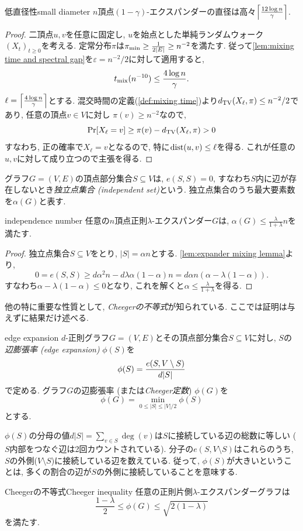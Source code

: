 \begin{proposition}{低直径性}{small diameter}
    $n$頂点$(1-\gamma)$-エクスパンダーの直径は高々$\ceil*{\frac{12\log n}{\gamma}}$.
\end{proposition}
\begin{proof}
    二頂点$u,v$を任意に固定し,
    $u$を始点とした単純ランダムウォーク$(X_t)_{t\ge 0}$を考える.
    定常分布$\pi$は$\pimin \ge \frac{1}{2|E|} \ge n^{-2}$を満たす.
    従って\cref{lem:mixing time and spectral gap}を$\varepsilon=n^{-2}/2$に対して適用すると,
    \[
        \tmix(n^{-10}) \le \frac{4\log n}{\gamma}.
    \]
    $\ell=\ceil*{\frac{4\log n}{\gamma}}$とする.
    混交時間の定義(\cref{def:mixing time})より$\dtv(X_{\ell}, \pi) \le n^{-2}/2$であり, 任意の頂点$v\in V$に対し
    $\pi(v) \ge n^{-2}$なので,
    \[
        \Pr[X_\ell = v] \ge \pi(v) - \dtv(X_\ell,\pi) >0
    \]
    すなわち, 正の確率で$X_\ell = v$となるので, 特に$\dist(u,v) \le \ell$を得る.
    これが任意の$u,v$に対して成り立つので主張を得る.
\end{proof}

グラフ$G = (V,E)$の頂点部分集合$S\subseteq V$は, $e(S,S)=0$, すなわち$S$内に辺が存在しないとき\emph{独立点集合 (independent set)}という.
独立点集合のうち最大要素数を$\alpha(G)$と表す.
\begin{proposition}{}{independence number}
    任意の$n$頂点正則$\lambda$-エクスパンダー$G$は, $\alpha(G) \le \frac{\lambda}{1+\lambda}n$を満たす.
\end{proposition}
\begin{proof}
    独立点集合$S\subseteq V$をとり, $|S|= \alpha n$とする.
    \cref{lem:expander mixing lemma}より,
    \[
        0 = e(S,S) \ge  d \alpha^2 n - d\lambda \alpha(1-\alpha) n = d\alpha n (\alpha - \lambda(1-\alpha)).
    \]
    すなわち$\alpha - \lambda(1-\alpha) \le 0$となり, これを解くと$\alpha\le \frac{\lambda}{1+\lambda}$を得る.
\end{proof}

他の特に重要な性質として, \emph{Cheegerの不等式}\cite{Cheeger70}が知られている.
ここでは証明は与えずに結果だけ述べる.
%
\begin{definition}{}{edge expansion}
    $d$-正則グラフ$G=(V,E)$とその頂点部分集合$S\subseteq V$に対し,
    $S$の\emph{辺膨張率 (edge expansion)} $\phi(S)$を
    \[
        \phi(S) = \frac{e(S,V\setminus S)}{d\abs{S}}
    \]
    で定める. グラフ$G$の辺膨張率 (または\emph{Cheeger定数}) $\phi(G)$を
    \[
        \phi(G) = \min_{0 \le |S| \le |V|/2} \phi(S)
    \]
    とする.
\end{definition}
$\phi(S)$の分母の値$d|S|  =\sum_{v\in S}\deg(v)$は$S$に接続している辺の総数に等しい ($S$内部をつなぐ辺は2回カウントされている).
分子の$e(S,V\setminus S)$はこれらのうち, $S$の外側($V\setminus S$)に接続している辺を数えている.
従って, $\phi(S)$が大きいということは, 多くの割合の辺が$S$の外側に接続していることを意味する.
\begin{theorem}{Cheegerの不等式}{Cheeger inequality}
    任意の正則片側$\lambda$-エクスパンダーグラフは
    \[
        \frac{1-\lambda}{2} \le \phi(G) \le \sqrt{2(1-\lambda)}
    \]
    を満たす.
\end{theorem}


